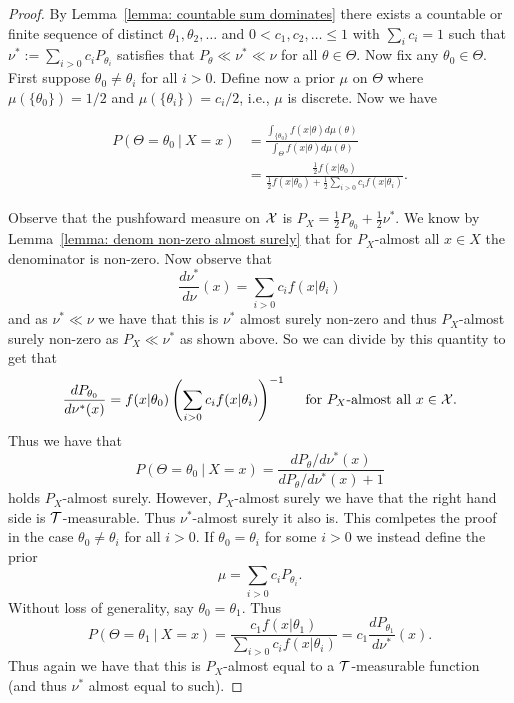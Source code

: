 \documentclass[twoside, a4paper, 10pt]{amsart}
\begin{document}
\begin{proof} By Lemma~\ref{lemma: countable sum dominates} there exists a countable or finite sequence of distinct $\theta_1, \theta_2,\ldots $ and $0<c_1,c_2, \ldots \leq 1$ with $\sum_{i} c_i=1$ such that $\nu^* := \sum_{i>0} c_i P_{\theta_i}$ satisfies that $P_{\theta} \ll \nu^* \ll \nu$ for all $\theta \in \Theta$. Now fix any $\theta_0 \in \Theta$. First suppose $\theta_0 \neq \theta_i$ for all $i>0$. Define now a prior $\mu$ on $\Theta$ where $\mu(\{\theta_0\}) = 1/2$ and $\mu(\{\theta_i\}) = c_i/2$, i.e., $\mu$ is discrete.  Now we have

\begin{align*} P(\Theta = \theta_0 ~|~ X=x) &= \frac{\int_{\{\theta_0\}} f(x|\theta) d\mu(\theta)}{\int_{\Theta} f(x|\theta) d\mu(\theta)} \\
&= \frac{\frac{1}{2} f(x|\theta_0) }{\frac{1}{2} f(x|\theta_0) + \frac{1}{2} \sum_{i>0} c_i f(x|\theta_i)}. \end{align*}

Observe that the pushfoward measure on $\mathcal{X}$ is $P_X = \frac{1}{2}P_{\theta_0} + \frac{1}{2} \nu^* $. We know by Lemma~\ref{lemma: denom non-zero almost surely} that for $P_X$-almost all $x \in X$ the denominator is non-zero. Now observe that $$\frac{d\nu^*}{d\nu} (x)= \sum_{i>0} c_i f(x|\theta_i)$$ and as $\nu^* \ll \nu$ we have that this is $\nu^*$ almost surely non-zero and thus $P_X$-almost surely non-zero as $P_X \ll \nu^*$ as shown above. So we can divide by this quantity to get that \begin{align}\label{eq: dP/dnu-star}\frac{dP_{\theta_0}}{d\nu^*(x)} = f(x|\theta_0)\left(\sum_{i>0} c_i f(x|\theta_i) \right)^{-1} \quad\text{ for $P_X$-almost all $x \in \mathcal{X}$}. \end{align} Thus we have that $$P(\Theta = \theta_0 ~|~X=x) = \frac{dP_{\theta}/d\nu^*(x)}{dP_{\theta}/d\nu^*(x) + 1} $$ holds $P_X$-almost surely. However, $P_X$-almost surely we have that the right hand side is $\mathcal{T}$-measurable. Thus $\nu^*$-almost surely it also is. This comlpetes the proof in the case $\theta_0 \neq \theta_i$ for all $i>0$. If $\theta_0 = \theta_i$ for some $i>0$ we instead define the prior $$\mu = \sum_{i>0} c_i P_{\theta_i}.$$ Without loss of generality, say $\theta_0 = \theta_1$. Thus $$P(\Theta = \theta_1 ~|~ X=x) = \frac{c_1 f(x|\theta_1)}{\sum_{i>0} c_i f(x|\theta_i)} = c_1 \frac{dP_{\theta_1}}{d\nu^*}(x).$$ Thus again we have that this is $P_X$-almost equal to a $\mathcal{T}$-measurable function (and thus $\nu^*$ almost equal to such).

\end{proof}
\end{document}
